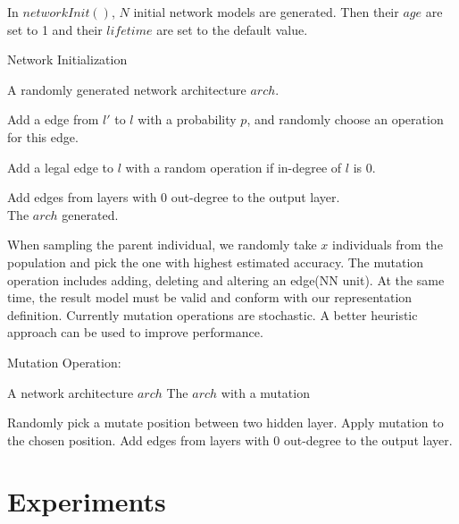 \documentclass[conference]{IEEEtran}
\begin{document}
In $networkInit()$, $N$ initial network models are generated. Then their $age $ are set to 1 and their $lifetime$ are set to the default value. 

 \begin{algorithm}[H]  
	\caption{ Network Initialization}
	
	
	\begin{algorithmic}[1]  
		\Ensure A randomly generated network architecture $arch$.
		
		\State Add a edge from $l'$ to $l$ with a probability $p$, and randomly choose an operation for this edge.
		\EndFor

				\State  Add a legal edge to $l$ with a random operation if in-degree of $l$ is 0.
		\EndIf

		\EndFor
		
		\State Add edges from layers with 0 out-degree to the output layer.
		\\
		\Return The $arch$ generated.
		
	\end{algorithmic}  
\end{algorithm}  

  When sampling the parent individual, we randomly take $x$ individuals from the population and pick the one with highest estimated accuracy. The mutation operation includes adding, deleting and altering an edge(NN unit). At the same time, the result model must be valid and conform with our representation definition. Currently mutation operations are stochastic. A better heuristic approach can be used to improve performance.

 \begin{algorithm}[H]  
	\caption{ Mutation Operation:}
 

	\begin{algorithmic}[1]  
	\Require A network architecture $arch$
	\Ensure The $arch$ with a mutation
	
	
		\State Randomly pick a mutate position between two hidden layer.
		\State Apply mutation to the chosen position. 
		\EndWhile
		\State Add edges from layers with 0 out-degree to the output layer.
		
	\end{algorithmic}  
\end{algorithm}  

 \section{Experiments}
\end{document}
